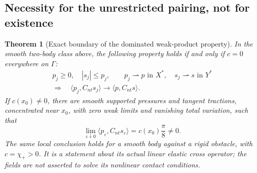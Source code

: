 \documentclass[11pt,a4paper]{article}
\newtheorem{theorem}{Theorem}[section]
\theoremstyle{definition}\newtheorem{definition}[theorem]{Definition}
\theoremstyle{remark}\newtheorem{remark}[theorem]{Remark}
\newcommand{\ip}[2]{\langle #1,#2\rangle}
\newcommand{\weak}{\rightharpoonup}
\numberwithin{equation}{section}
\begin{document}
\subsection{Necessity for the unrestricted pairing, not for existence}
\begin{theorem}[Exact boundary of the dominated weak-product property]\label{thm:classification}
In the smooth two-body class above, the following property holds if and only if $c=0$ everywhere on $\Gamma$:
\begin{gather*}
 p_j\ge0,\quad |s_j|\le p_j,\qquad
 p_j\weak p\text{ in }X^*,\quad s_j\weak s\text{ in }Y^*\\
 \Longrightarrow\quad
 \ip{p_j}{C_{nt}s_j}\longrightarrow\ip{p}{C_{nt}s}.
\end{gather*}
If $c(x_0)\ne0$, there are smooth supported pressures and tangent tractions, concentrated near $x_0$, with zero weak limits and vanishing total variation, such that
\begin{equation}\label{eq:curveddefect}
 \lim_{\varepsilon\downarrow0}\ip{p_\varepsilon}{C_{nt}s_\varepsilon}
                 =c(x_0)\frac\pi8\ne0.
\end{equation}
The same local conclusion holds for a smooth body against a rigid obstacle, with $c=\chi_+>0$. It is a statement about its actual \emph{linear elastic cross operator}; the fields are not asserted to solve its nonlinear contact conditions.
\end{theorem}
\end{document}
